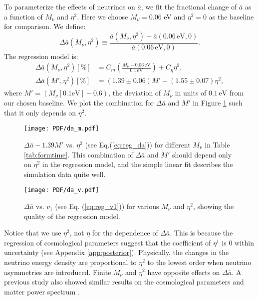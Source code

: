 To parameterize the effects of neutrinos on $\bar a$, we fit the fractional change of $\bar a$ as a function of $M_\nu$ and $\eta^2$. Here we choose $M_\nu = 0.06$ eV and $\eta^2=0$ as the baseline for comparison. We define:
\begin{equation}
    \Delta \bar a(M_\nu,\eta^2) \equiv \frac{\bar a(M_\nu, \eta^2) - \bar a(0.06\mathrm{ \,eV}, 0)}{\bar a(0.06\mathrm{\,eV}, 0)}.
\end{equation}
The regression model is:
\begin{align}
\label{eq:reg_da}
    \Delta \bar a(M_\nu,\eta^2) [\%] &= C_m \left(\frac{M_\nu-0.06\mathrm{\, eV}}{0.1\mathrm{\, eV}}\right) + C_\eta\eta^2, \nonumber \\
    \Delta \bar a(M',\eta^2) [\%]&= (1.39\pm0.06)M' -(1.55\pm0.07)\eta^2,
\end{align}
where $M'=(M_\nu[\mathrm{0.1eV}]-0.6)$, the deviation of $M_\nu$ in units of $0.1\,\mathrm{eV}$ from our chosen baseline. We plot the combination for $\Delta \bar a$ and $M'$ in Figure \ref{fig:da_m} such that it only depends on $\eta^2$.

\begin{figure}[!h]
		\begin{center}%
		\texttt{[image: PDF/da\_m.pdf]}
		\caption{$\Delta \bar a - 1.39M'$ vs. $\eta^2$ (see Eq.(\ref{eq:reg_da})) for different $M_\nu$ in Table \ref{tab:formtime}. This combination of $\Delta \bar a$ and $M'$ should depend only on $\eta^2$ in the regression model, and the simple linear fit describes the simulation data quite well.}
		\label{fig:da_m}
		\end{center}
\end{figure}
\begin{figure}[!h]
		\begin{center}%
		\texttt{[image: PDF/da\_v.pdf]}
		\caption{$\Delta {\bar a}$ vs. $v_1$ (see Eq. (\ref{eq:reg_v1})) for various $M_\nu$ and $\eta^2$, showing the quality of the regression model.}
		\label{fig:da_v}
		\end{center}
\end{figure}


Notice that we use $\eta^2$, not $\eta$ for the dependence of $\Delta \bar a$. 
This is because the regression of cosmological parameters suggest that the coefficient of $\eta^1$ is 0 within uncertainty (see Appendix \ref{app:posterior}).
Physically, the changes in the neutrino energy density are proportional to $\eta^2$ to the lowest order when neutrino asymmetries are introduced.
Finite $M_\nu$ and $\eta^2$ have opposite effects on $\Delta \bar a$. A previous study also showed similar results on the cosmological parameters and matter power spectrum \cite{Carton}.


